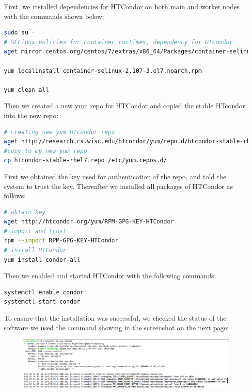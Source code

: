 \documentclass{article}
\begin{document}
First, we installed dependencies for HTCondor \cite{condor-practice} on both main and worker nodes with the commands shown below:

\begin{lstlisting}[language=bash]
sudo su -
# SELinux policies for container runtimes, dependency for HTcondor
wget mirror.centos.org/centos/7/extras/x86_64/Packages/container-selinux-2.107-3.el7.noarch.rpm 

yum localinstall container-selinux-2.107-3.el7.noarch.rpm 

yum clean all 
\end{lstlisting}

Then we created a new yum repo for HTCondor and copied the stable HTcondor into the new repo:
\begin{lstlisting}[language=bash]
# creating new yum HTcondor repo
wget http://research.cs.wisc.edu/htcondor/yum/repo.d/htcondor-stable-rhel7.repo 
#copy to my new yum repo
cp htcondor-stable-rhel7.repo /etc/yum.repos.d/ 
\end{lstlisting}

First we obtained the key used for authentication of the repo, and told the system to trust the key. Thereafter we installed all packages of HTCondor as follows:
\begin{lstlisting}[language=bash]
# obtain key
wget http://htcondor.org/yum/RPM-GPG-KEY-HTCondor
# import and trust
rpm --import RPM-GPG-KEY-HTCondor
# install HTCondor
yum install condor-all 
\end{lstlisting}

Then we enabled and started HTCondor with the following commands:
\begin{lstlisting}[language=bash]
systemctl enable condor
systemctl start condor
\end{lstlisting}

To ensure that the installation was successful, we checked the status of the software we used the command showing in the screenshot on the next page:

\begin{figure}[!h]
    \center%
    \includegraphics[width=\textwidth]{./img/condor_status.png}
\end{figure}
\end{document}

